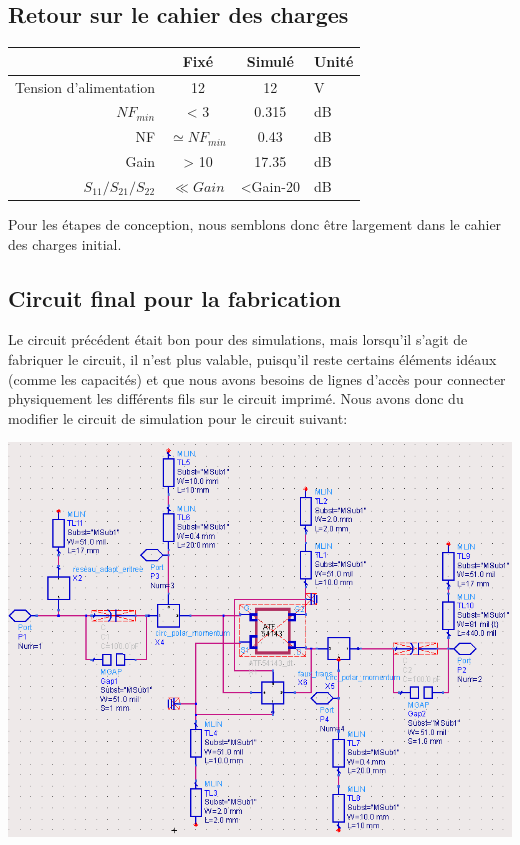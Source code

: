 \documentclass[12pt]{article}
\begin{document}
\subsection{Retour sur le cahier des charges}

\begin{center}
\begin{tabular}{|r|c|c|l|}
\hline 
 & Fixé & Simulé & Unité\\ 
\hline 
Tension d’alimentation & 12 & 12 & V \\
\hline 
$NF_{min}$ & < 3 & 0.315 & dB\\ 
\hline 
NF & $\simeq NF_{min}$ & 0.43 & dB\\ 
\hline 
Gain & > 10 & 17.35 & dB \\ 
\hline 
$S_{11}/S_{21}/S_{22}$ & $\ll Gain$ & <Gain-20 & dB \\
\hline
\end{tabular} 
\end{center}

Pour les étapes de conception, nous semblons donc être largement dans le cahier des charges initial.

\subsection{Circuit final pour la fabrication}

Le circuit précédent était bon pour des simulations, mais lorsqu’il s’agit de fabriquer le circuit, il n’est plus valable, puisqu’il reste certains éléments idéaux (comme les capacités) et que nous avons besoins de lignes d’accès pour connecter physiquement les différents fils sur le circuit imprimé. Nous avons donc du modifier le circuit de simulation pour le circuit suivant:

\begin{center}
\includegraphics[width=\linewidth]{img/circuit_pour_gerber}
\end{center}
\end{document}
